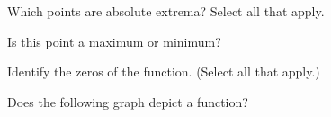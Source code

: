 \documentclass{ximeraXloud}
\begin{document}
\begin{problem}
    Which points are absolute extrema? Select all that apply.
        \begin{selectAll}
        \end{selectAll}
    \begin{problem}
        Is this point a maximum or minimum?
        \begin{multipleChoice}
        \end{multipleChoice}
    \end{problem}
\end{problem}

\begin{problem}
    Identify the zeros of the function. (Select all that apply.)
    \begin{selectAll}
    \end{selectAll}
\end{problem}

\begin{problem}
    Does the following graph depict a function?


    \begin{multipleChoice}
    \end{multipleChoice}
\end{problem}
\end{document}

